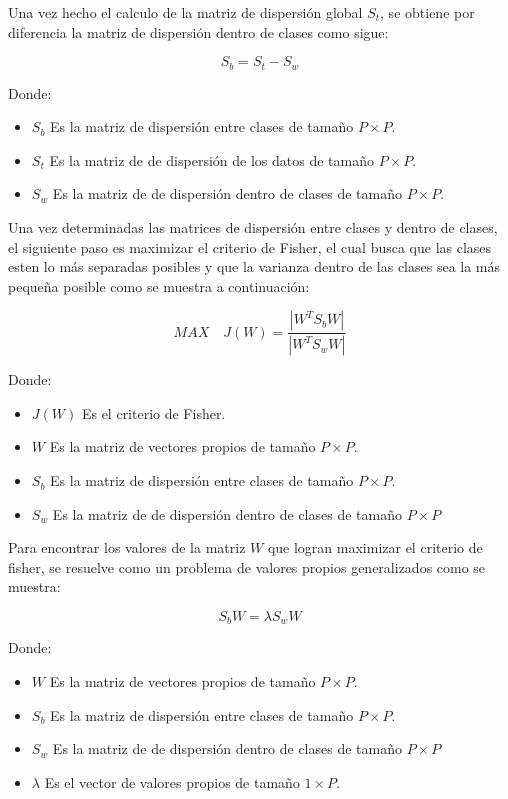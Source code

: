 \documentclass[11pt, letterpaper]{article}
\begin{document}
Una vez hecho el calculo de la matriz de dispersión global $S_t$, se obtiene por diferencia la matriz de dispersión dentro de clases como sigue:

$$S_b = S_t-S_w$$

Donde: 

\begin{itemize}
	\item $S_b$ Es la matriz de dispersión entre clases de tamaño $P\times P$.
	\item $S_t$ Es la matriz de de dispersión de los datos de tamaño $P \times P$.
	\item $S_w$ Es la matriz de de dispersión dentro de clases de tamaño $P \times P$.
\end{itemize}

Una vez determinadas las matrices de dispersión entre clases y dentro de clases, el siguiente paso es maximizar el criterio de Fisher, el cual busca que las clases esten lo más separadas posibles y que la varianza dentro de las clases sea la más pequeña posible como se muestra a continuación:

$$MAX \quad J(W)  = \frac{|W^TS_bW|}{|W^TS_wW|}$$

Donde: 

\begin{itemize}
	\item $J(W)$ Es el criterio de Fisher.
	\item $W$ Es la matriz de vectores propios de tamaño $P \times P$.
	\item $S_b$ Es la matriz de dispersión entre clases de tamaño $P\times P$.
	\item $S_w$ Es la matriz de de dispersión dentro de clases de tamaño $P \times P$
\end{itemize}

\newpage

Para encontrar los valores de la matriz $W$ que logran maximizar el criterio de fisher, se resuelve como un problema de valores propios generalizados como se muestra:

$$S_bW = \lambda S_wW$$

Donde: 

\begin{itemize}
	\item $W$ Es la matriz de vectores propios de tamaño $P \times P$.
	\item $S_b$ Es la matriz de dispersión entre clases de tamaño $P\times P$.
	\item $S_w$ Es la matriz de de dispersión dentro de clases de tamaño $P \times P$
	\item $\lambda$ Es el vector de valores propios de tamaño $1 \times P$.
\end{itemize}
\end{document}

